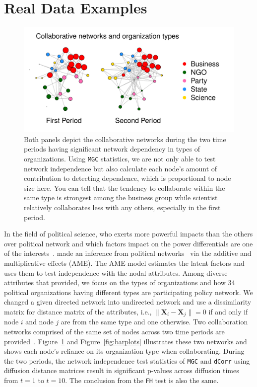 \documentclass[11pt]{article}
\theoremstyle{definition}
\begin{document}
\section{Real Data Examples}
\label{sec:real}
\begin{figure}[h]
	\centering
	\includegraphics[width=\linewidth]{../Figure/two_politics.pdf}
	\caption{Both panels depict the collaborative networks during the two time periods having significant network dependency in types of organizations. Using \texttt{MGC} statistics, we are not only able to test network independence but also calculate each node's amount of contribution to detecting dependence, which is proportional to node size here. You can tell that the tendency to collaborate within the same type is strongest among the business group while scientist relatively collaborates less with any others, especially in the first period.}
	\label{fig:politics}
\end{figure}
In the field of political science, who exerts more powerful impacts than the others over political network and which factors impact on the power differentials are one of the interests~\citep{ingold2014structural}. \cite{minhas2016inferential} made an inference from political networks~\citep{cranmer2016navigating} via the additive and multiplicative effects (AME). The AME model estimates the latent factors and uses them to test independence with the nodal attributes. Among diverse attributes that \cite{cranmer2016navigating} provided, we focus on the types of organizations and how 34 political organizations having different types are participating policy network. We changed a given directed network into undirected network and use a dissimilarity matrix for distance matrix of the attributes, i.e., $\parallel \mathbf{X}_{i}  - \mathbf{X}_{j} \parallel = 0$ if and only if node $i$ and node $j$ are from the same type and one otherwise. Two collaboration networks comprised of the same set of nodes across two time periods are provided~\citep{ingold2014structural}. Figure~\ref{fig:politics} and Figure~\ref{fig:barplots} illustrates these two networks and shows each node's reliance on its organization type when collaborating. During the two periods, the network independence test statistics of \texttt{MGC} and \texttt{dCorr} using diffusion distance matrices result in significant p-values across diffusion times from $t=1$ to $t=10$. The conclusion from the \texttt{FH} test is also the same.  
\end{document}
